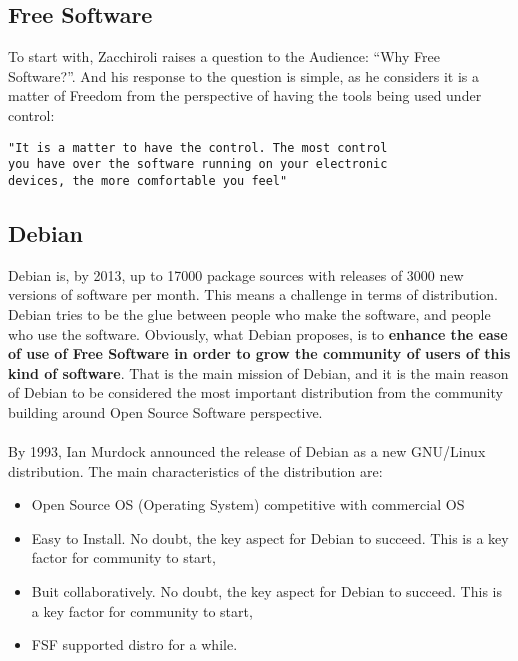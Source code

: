 \documentclass[11pt]{article}
\begin{document}
\subsection{Free Software}
To start with, Zacchiroli raises a question to the Audience: ``Why Free Software?''. And his response to the question is simple, as he considers it is a matter of Freedom from the perspective of having the tools being used under control:
\begin{verbatim}
"It is a matter to have the control. The most control
you have over the software running on your electronic
devices, the more comfortable you feel"
\end{verbatim}

\subsection{Debian}
Debian is, by 2013, up to 17000 package sources with releases of 3000 new versions of software per month. This means a challenge in terms of distribution. Debian tries to be the glue between people who make the software, and people who use the software. Obviously, what Debian proposes, is to \textbf{enhance the ease of use of Free Software in order to grow the community of users of this kind of software}. That is the main mission of Debian, and it is the main reason of Debian to be considered the most important distribution from the community building around Open Source Software perspective.\\
\\
By 1993, Ian Murdock announced the release of Debian as a new GNU/Linux distribution. The main characteristics of the distribution are:
\begin{itemize}\itemsep0pt
\item{Open Source OS (Operating System) competitive with commercial OS}
\item{Easy to Install}. No doubt, the key aspect for Debian to succeed. This is a key factor for community to start, 
\item{Buit collaboratively}. No doubt, the key aspect for Debian to succeed. This is a key factor for community to start, 
\item{FSF supported distro for a while}.
\end{itemize}
\end{document}
